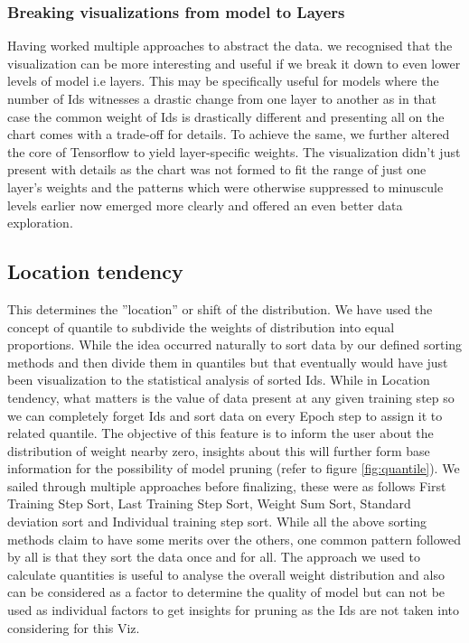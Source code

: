 \documentclass[journal]{vgtc}                %
\begin{document}
\subsubsection{Breaking visualizations from model  to Layers}
Having worked multiple approaches to abstract the data.
we recognised that the visualization can be more interesting and useful if we break it down to even lower levels of model i.e layers.
This may be specifically useful for models where the number of Ids witnesses a drastic change from one layer to another as in that case the common weight of Ids 
is drastically different and presenting all on the chart comes with a trade-off for details. To achieve the same, we further altered the core of Tensorflow to yield layer-specific weights.
The visualization didn't just present with details as the chart was not formed to fit the range of just one layer's weights and the patterns which were otherwise suppressed to minuscule levels earlier now emerged more clearly and offered an even better data exploration.


\subsection{Location tendency}
This determines the ”location” or shift of the distribution. We have used the concept of quantile to subdivide the weights of distribution into equal proportions. While the idea occurred naturally to sort data by our defined sorting methods and then divide them in quantiles but that eventually would have just been visualization to the statistical analysis of sorted Ids.
While in Location tendency, what matters is the value of data present at any given training step so we can completely forget Ids and sort data on every Epoch step to assign it to related quantile. The objective of this feature is to inform the user about the distribution of weight nearby zero, insights about this will further form base information for the possibility of model pruning (refer to figure \ref{fig:quantile}). We sailed through multiple approaches before finalizing, these were as follows  First Training Step  Sort,  Last Training Step Sort, Weight Sum Sort, Standard deviation sort and Individual training step sort. While all the above sorting methods claim to have some merits over the others, one common pattern followed by all is that they sort the data once and for all.
 The approach we used to calculate quantities is useful to analyse the overall weight distribution and also can be considered as a factor to determine the quality of model but can not be used as individual factors to get insights for pruning as the Ids are not taken into considering for this Viz.
 
\end{document}
